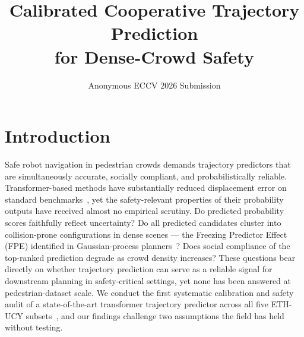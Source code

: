 \documentclass{article}
\title{Calibrated Cooperative Trajectory Prediction\\
       for Dense-Crowd Safety}
\author{Anonymous ECCV 2026 Submission}
\date{}
\begin{document}
\maketitle

\section{Introduction}
\label{sec:intro}

Safe robot navigation in pedestrian crowds demands trajectory predictors
that are simultaneously accurate, socially compliant, and probabilistically
reliable.
Transformer-based methods have substantially reduced displacement error on
standard benchmarks~\cite{shi2023tutr,mohamed2020social}, yet the
safety-relevant properties of their probability outputs have received
almost no empirical scrutiny.
Do predicted probability scores faithfully reflect uncertainty?
Do all predicted candidates cluster into collision-prone configurations in
dense scenes --- the Freezing Predictor Effect (FPE) identified in
Gaussian-process planners~\cite{trautman2010unfreezing}?
Does social compliance of the top-ranked prediction degrade as crowd
density increases?
These questions bear directly on whether trajectory prediction can serve
as a reliable signal for downstream planning in safety-critical settings,
yet none has been answered at pedestrian-dataset scale.
We conduct the first systematic calibration and safety audit of a
state-of-the-art transformer trajectory predictor across all five
ETH-UCY subsets~\cite{pellegrini2009eth,lerner2007ucy}, and our
findings challenge two assumptions the field has held without testing.
\end{document}
